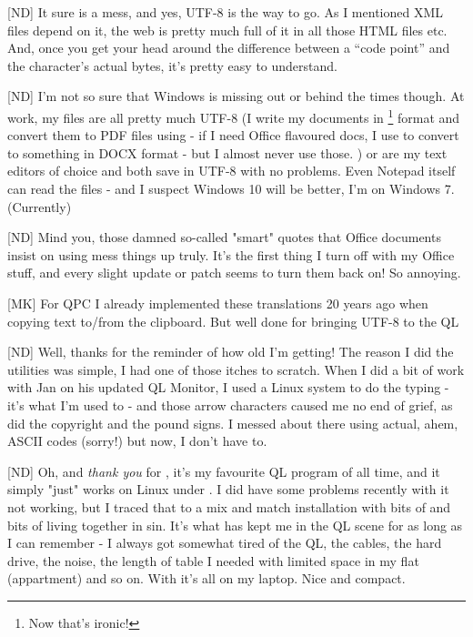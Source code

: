 [ND] It sure is a mess, and yes, UTF-8 is the way to go. As I mentioned XML files depend on it, the web is pretty much full of it in all those HTML files etc. And, once you get your head around the difference between a ``code point'' and the character's actual bytes, it's pretty easy to understand.

[ND] I'm not so sure that Windows is missing out or behind the times though. At work, my files are all pretty much UTF-8 (I write my documents in \footnote{Now that's ironic!} format and convert them to PDF files using  - if I need Office flavoured docs, I use  to convert to something in DOCX format - but I almost never use those. )  or  are my text editors of choice and both save in UTF-8 with no problems. Even Notepad itself can read the files - and I suspect Windows 10 will be better, I'm on Windows 7. (Currently)

[ND] Mind you, those damned so-called "smart" quotes that Office documents insist on using mess things up truly. It's the first thing I turn off with my Office stuff, and every slight update or patch seems to turn them back on! So annoying.

[MK] For QPC I already implemented these translations 20 years ago when
copying text to/from the clipboard. But well done for bringing UTF-8
to the QL 

[ND] Well, thanks for the reminder of how old I'm getting! The reason I did the utilities was simple, I had one of those itches to scratch. When I did a bit of work with Jan on his updated QL Monitor, I used a Linux system to do the typing - it's what I'm used to - and those arrow characters caused me no end of grief, as did the copyright and the pound signs. I messed about there using actual, ahem, ASCII codes (sorry!) but now, I don't have to.

[ND] Oh, and \emph{thank you} for , it's my favourite QL program of all time, and it simply "just" works on Linux under . I did have some problems recently with it not working, but I traced that to a mix and match installation with bits of  and bits of  living together in sin. It's what has kept me in the QL scene for as long as I can remember - I always got somewhat tired of the QL, the cables, the hard drive, the noise, the length of table I needed with limited space in my flat (appartment) and so on. With  it's all on my laptop. Nice and compact.
